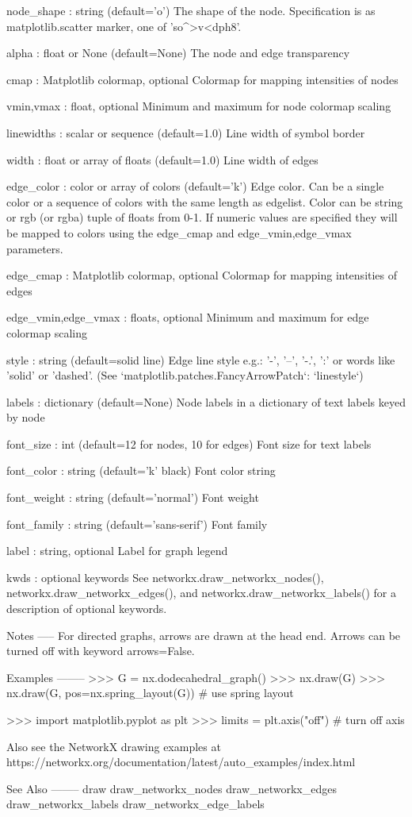 \begin{DoxyVerb}
node_shape :  string (default='o')
    The shape of the node.  Specification is as matplotlib.scatter
    marker, one of 'so^>v<dph8'.

alpha : float or None (default=None)
    The node and edge transparency

cmap : Matplotlib colormap, optional
    Colormap for mapping intensities of nodes

vmin,vmax : float, optional
    Minimum and maximum for node colormap scaling

linewidths : scalar or sequence (default=1.0)
    Line width of symbol border

width : float or array of floats (default=1.0)
    Line width of edges

edge_color : color or array of colors (default='k')
    Edge color. Can be a single color or a sequence of colors with the same
    length as edgelist. Color can be string or rgb (or rgba) tuple of
    floats from 0-1. If numeric values are specified they will be
    mapped to colors using the edge_cmap and edge_vmin,edge_vmax parameters.

edge_cmap : Matplotlib colormap, optional
    Colormap for mapping intensities of edges

edge_vmin,edge_vmax : floats, optional
    Minimum and maximum for edge colormap scaling

style : string (default=solid line)
    Edge line style e.g.: '-', '--', '-.', ':'
    or words like 'solid' or 'dashed'.
    (See `matplotlib.patches.FancyArrowPatch`: `linestyle`)

labels : dictionary (default=None)
    Node labels in a dictionary of text labels keyed by node

font_size : int (default=12 for nodes, 10 for edges)
    Font size for text labels

font_color : string (default='k' black)
    Font color string

font_weight : string (default='normal')
    Font weight

font_family : string (default='sans-serif')
    Font family

label : string, optional
    Label for graph legend

kwds : optional keywords
    See networkx.draw_networkx_nodes(), networkx.draw_networkx_edges(), and
    networkx.draw_networkx_labels() for a description of optional keywords.

Notes
-----
For directed graphs, arrows  are drawn at the head end.  Arrows can be
turned off with keyword arrows=False.

Examples
--------
>>> G = nx.dodecahedral_graph()
>>> nx.draw(G)
>>> nx.draw(G, pos=nx.spring_layout(G))  # use spring layout

>>> import matplotlib.pyplot as plt
>>> limits = plt.axis("off")  # turn off axis

Also see the NetworkX drawing examples at
https://networkx.org/documentation/latest/auto_examples/index.html

See Also
--------
draw
draw_networkx_nodes
draw_networkx_edges
draw_networkx_labels
draw_networkx_edge_labels
\end{DoxyVerb}

